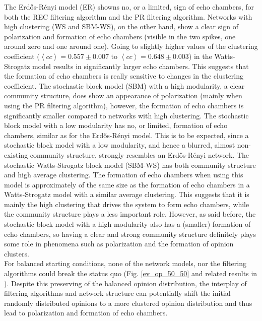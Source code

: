 \documentclass[11 pt , letterpaper , twoside , openright]{book}
\begin{document}
The Erd\H{o}s-R\'{e}nyi model (ER) showns no, or a limited, sign of echo chambers, for both the REC filtering algorithm and the PR filtering algorithm. Networks with high clustering (WS and SBM-WS), on the other hand, show a clear sign of polarization and formation of echo chambers (visible in the two spikes, one around zero and one around one). Going to slightly higher values of the clustering coefficient ($\left<cc\right> = 0.557 \pm 0.007$ to $\left<cc\right> = 0.648 \pm 0.003$) in the Watts-Strogatz model results in significantly larger echo chambers. This suggests that the formation of echo chambers is really sensitive to changes in the clustering coefficient. The stochastic block model (SBM) with a high modularity, a clear community structure, does show an appearance of polarization (mainly when using the PR filtering algorithm), however, the formation of echo chambers is significantly smaller compared to networks with high clustering. The stochastic block model with a low modularity has no, or limited, formation of echo chambers, similar as for the Erd\H{o}s-R\'{e}nyi   
model. This is to be expected, since a stochastic block model with a low modularity, and hence a blurred, almost non-existing community structure, strongly resembles an Erd\H{o}s-R\'{e}nyi network. The stochastic Watts-Strogatz block model (SBM-WS) has both community structure and high average clustering. The formation of echo chambers when using this model is approximately of the same size as the formation of echo chambers in a Watts-Strogatz model with a similar average clustering. This suggests that it is mainly the high clustering that drives the system to form echo chambers, while the community structure plays a less important role. However, as said before, the stochastic block model with a high modularity also has a (smaller) formation of echo chambers, so having a clear and strong community structure definitely plays some role in phenomena such as polarization and the formation of opinion clusters. \\
\newline
For balanced starting conditions, none of the network models, nor the filtering algorithms could break the status quo (Fig. \ref{ev_op_50_50} and related results in \cite{Perra2019}). Despite this preserving of the balanced opinion distribution, the interplay of filtering algorithms and network structure can potentially shift the initial randomly distributed opinions to a more clustered opinion distribution and thus lead to polarization and formation of echo chambers.
\end{document}

